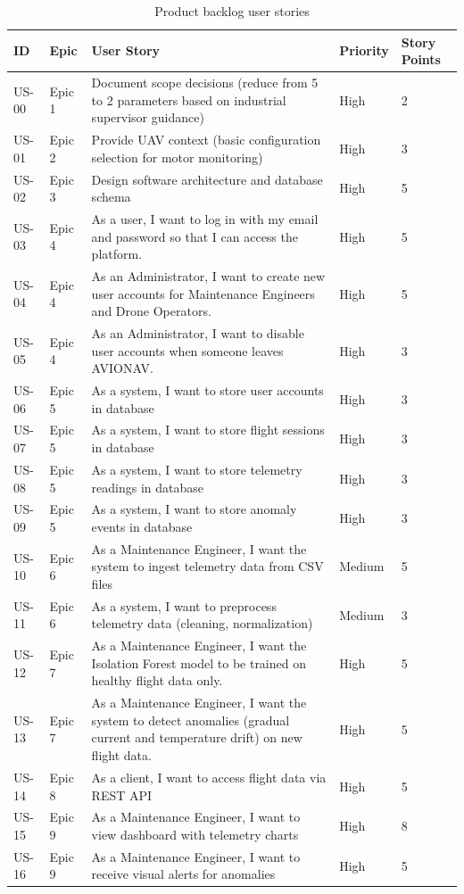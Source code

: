 \begin{table}[H]
\centering
\caption{Product backlog user stories}
\begin{tabular}{|p{1.5cm}|p{2.5cm}|p{5cm}|p{1.5cm}|p{1.5cm}|}
\hline
\textbf{ID} & \textbf{Epic} & \textbf{User Story} & \textbf{Priority} & \textbf{Story Points} \\
\hline
US-00 & Epic 1 & Document scope decisions (reduce from 5 to 2 parameters based on industrial supervisor guidance) & High & 2 \\
\hline
US-01 & Epic 2 & Provide UAV context (basic configuration selection for motor monitoring) & High & 3 \\
\hline
US-02 & Epic 3 & Design software architecture and database schema & High & 5 \\
\hline
US-03 & Epic 4 & As a user, I want to log in with my email and password so that I can access the platform. & High & 5 \\
\hline
US-04 & Epic 4 & As an Administrator, I want to create new user accounts for Maintenance Engineers and Drone Operators. & High & 5 \\
\hline
US-05 & Epic 4 & As an Administrator, I want to disable user accounts when someone leaves AVIONAV. & High & 3 \\
\hline
US-06 & Epic 5 & As a system, I want to store user accounts in database & High & 3 \\
\hline
US-07 & Epic 5 & As a system, I want to store flight sessions in database & High & 3 \\
\hline
US-08 & Epic 5 & As a system, I want to store telemetry readings in database & High & 3 \\
\hline
US-09 & Epic 5 & As a system, I want to store anomaly events in database & High & 3 \\
\hline
US-10 & Epic 6 & As a Maintenance Engineer, I want the system to ingest telemetry data from CSV files & Medium & 5 \\
\hline
US-11 & Epic 6 & As a system, I want to preprocess telemetry data (cleaning, normalization) & Medium & 3 \\
\hline
US-12 & Epic 7 & As a Maintenance Engineer, I want the Isolation Forest model to be trained on healthy flight data only. & High & 5 \\
\hline
US-13 & Epic 7 & As a Maintenance Engineer, I want the system to detect anomalies (gradual current and temperature drift) on new flight data. & High & 5 \\
\hline
US-14 & Epic 8 & As a client, I want to access flight data via REST API & High & 5 \\
\hline
US-15 & Epic 9 & As a Maintenance Engineer, I want to view dashboard with telemetry charts & High & 8 \\
\hline
US-16 & Epic 9 & As a Maintenance Engineer, I want to receive visual alerts for anomalies & High & 5 \\
\hline
\end{tabular}
\end{table}

